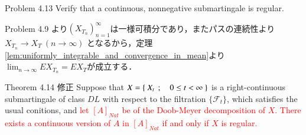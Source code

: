 	\begin{itembox}[l]{Problem 4.13}
		Verify that a continuous, nonnegative submartingale is regular. 
	\end{itembox}
	
	\begin{prf}
		Problem 4.9 より$(X_{T_n})_{n=1}^\infty$は一様可積分であり，またパスの連続性より
		$X_{T_n} \longrightarrow X_T\ (n \longrightarrow \infty)$
		となるから，定理\ref{lem:uniformly_integrable_and_convergence_in_mean}より
		$\lim_{n \to \infty} EX_{T_n} = EX_T$が成立する．
		\QED
	\end{prf}
	
	\begin{itembox}[l]{Theorem 4.14 修正}
		Suppose that $X = \left\{\ X_t\ \, ; \quad 0 \leq t < \infty\ \right\}$ is a right-continuous submartingale
		of class $DL$ with respect to the filtration $\{\mathscr{F}_t\}$, which
		satisfies the usual conitions, and 
		\textcolor{red}{let $[A]_{Nat}$ be of the Doob-Meyer decomposition of $X$.
		There exists a continuous version of $A$ in $[A]_{Nat}$ if and only if $X$ is regular.}
	\end{itembox}
	
